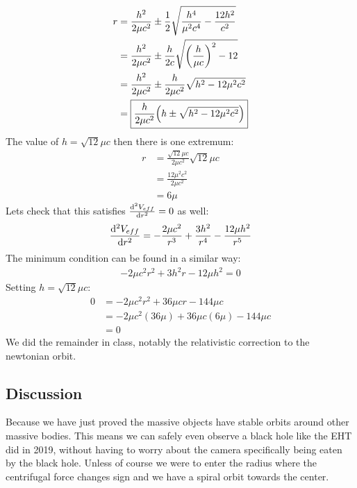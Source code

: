 \documentclass[12pt]{article}
\begin{document}
\begin{align*}
  r&=\frac{h^2}{2\mu c^2}\pm
  \frac{1}{2}\sqrt{\frac{h^4}{\mu^2c^4}-\frac{12h^2}{c^2}}\\
  &=\frac{h^2}{2\mu c^2}\pm\frac{h}{2c}\sqrt{\qty(\frac{h}{\mu c})^2-12}\\
  &=\frac{h^2}{2\mu c^2}\pm\frac{h}{2\mu c^2}\sqrt{h^2-12\mu^2c^2}\\
  &=\boxed{\frac{h}{2\mu c^2}\qty(h\pm\sqrt{h^2-12\mu^2c^2})}
\end{align*}
The value of $h=\sqrt{12}\mu c$ then there is one extremum:
\begin{align*}
  r&=\frac{\sqrt{12}\mu c}{2\mu c^2}\sqrt{12}\mu c\\
  &=\frac{12\mu^2c^2}{2\mu c^2}\\
  &=6\mu
\end{align*}
Lets check that this satisfies $\dv[2]{V_{eff}}{r}=0$ as well:
\begin{align*}
  \dv[2]{V_{eff}}{r}=-\frac{2\mu c^2}{r^3}+\frac{3h^2}{r^4}-\frac{12\mu h^2}{r^5}
\end{align*}
The minimum condition can be found in a similar way:
\begin{align*}
  \boxed{-2\mu c^2r^2+3h^2r-12\mu h^2=0}
\end{align*}
Setting $h=\sqrt{12}\mu c$:
\begin{align*}
  0&=-2\mu c^2r^2+36\mu cr-144\mu c\\
  &=-2\mu c^2(36\mu)+36\mu c(6\mu)-144\mu c\\
  &=0
\end{align*}
We did the remainder in class, notably the relativistic correction to the newtonian orbit.

\subsection{Discussion}
Because we have just proved the massive objects have stable orbits around other massive bodies. This means we can safely even observe a black hole like the EHT did in 2019, without having to worry about the camera specifically being eaten by the black hole. Unless of course we were to enter the radius where the centrifugal force changes sign and we have a spiral orbit towards the center.
\end{document}
